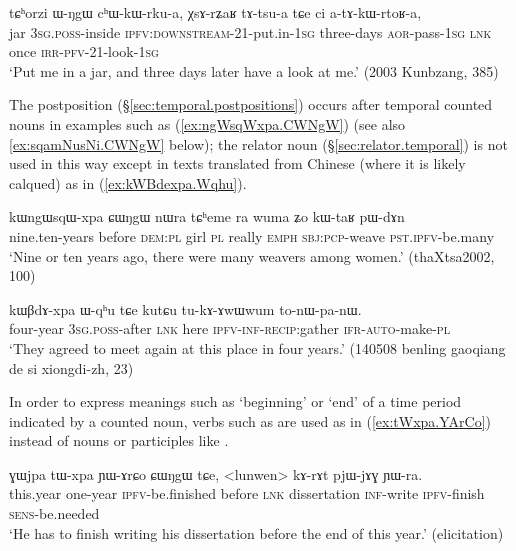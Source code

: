\begin{exe}
\ex \label{ex:tAtsua}
\gll  tɕʰorzi ɯ-ŋgɯ cʰɯ-kɯ-rku-a, χsɤ-rʑaʁ tɤ-tsu-a tɕe ci a-tɤ-kɯ-rtoʁ-a, \\
jar \textsc{3sg}.\textsc{poss}-inside \textsc{ipfv}:\textsc{downstream}-2\fl{}1-put.in-\textsc{1sg} three-days \textsc{aor}-pass-\textsc{1sg} \textsc{lnk} once \textsc{irr}-\textsc{pfv}-2\fl{}1-look-\textsc{1sg} \\
\glt `Put me in a jar, and three days later have a look at me.' (2003 Kunbzang, 385)
\end{exe} 

The postposition  (§\ref{sec:temporal.postpositions}) occurs after temporal counted nouns in examples such as (\ref{ex:ngWsqWxpa.CWNgW}) (see also \ref{ex:sqamNusNi.CWNgW}  below); the relator noun  (§\ref{sec:relator.temporal}) is not used in this way except in texts translated from Chinese (where it is likely calqued) as in (\ref{ex:kWBdexpa.Wqhu}).

\begin{exe}
\ex \label{ex:ngWsqWxpa.CWNgW}
 \gll kɯngɯsqɯ-xpa ɕɯŋgɯ nɯra tɕʰeme ra wuma ʑo kɯ-taʁ pɯ-dɤn \\
nine.ten-years before \textsc{dem}:\textsc{pl} girl \textsc{pl} really \textsc{emph} \textsc{sbj}:\textsc{pcp}-weave \textsc{pst}.\textsc{ipfv}-be.many \\
 \glt `Nine or ten years ago, there were many weavers among women.' (thaXtsa2002, 100)
\end{exe}

\begin{exe}
\ex \label{ex:kWBdexpa.Wqhu}
\gll  kɯβdɤ-xpa ɯ-qʰu tɕe kutɕu tu-kɤ-ɤwɯwum to-nɯ-pa-nɯ. \\
four-year \textsc{3sg}.\textsc{poss}-after \textsc{lnk} here \textsc{ipfv}-\textsc{inf}-\textsc{recip}:gather \textsc{ifr}-\textsc{auto}-make-\textsc{pl} \\
\glt `They agreed to meet again at this place in four years.' (140508 benling gaoqiang de si xiongdi-zh, 23)
\end{exe} 

In order to express meanings such as `beginning' or `end' of a time period indicated by a counted noun, verbs such as  are used as in (\ref{ex:tWxpa.YArCo}) instead of nouns or participles like .

\begin{exe}
\ex \label{ex:tWxpa.YArCo}
\gll ɣɯjpa tɯ-xpa ɲɯ-ɤrɕo ɕɯŋgɯ tɕe, <lunwen> kɤ-rɤt pjɯ-jɤɣ ɲɯ-ra. \\
this.year one-year \textsc{ipfv}-be.finished  before \textsc{lnk} dissertation \textsc{inf}-write \textsc{ipfv}-finish \textsc{sens}-be.needed \\
\glt `He has to finish writing his dissertation before the end of this year.' (elicitation)
\end{exe} 

